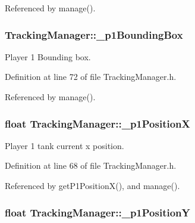 Referenced by manage().

\hypertarget{classTrackingManager_a4916085aebb34a3921f3592d7ae07767}{
\subsubsection[{\-\_\-p1\-Bounding\-Box}]{ Tracking\-Manager\-::\-\_\-p1\-Bounding\-Box\hspace{0.3cm}{\ttfamily [private]}}}\label{classTrackingManager_a4916085aebb34a3921f3592d7ae07767}


Player 1 Bounding box. 



Definition at line 72 of file Tracking\-Manager.\-h.



Referenced by manage().

\hypertarget{classTrackingManager_a14b43a5e0cd605fff6b3308d0377f697}{
\subsubsection[{\-\_\-p1\-Position\-X}]{\setlength{\rightskip}{0pt plus 5cm}float Tracking\-Manager\-::\-\_\-p1\-Position\-X\hspace{0.3cm}{\ttfamily [private]}}}\label{classTrackingManager_a14b43a5e0cd605fff6b3308d0377f697}


Player 1 tank current x position. 



Definition at line 68 of file Tracking\-Manager.\-h.



Referenced by get\-P1\-Position\-X(), and manage().

\hypertarget{classTrackingManager_aa5b384a370b1ddccf76badc8a55459b1}{
\subsubsection[{\-\_\-p1\-Position\-Y}]{\setlength{\rightskip}{0pt plus 5cm}float Tracking\-Manager\-::\-\_\-p1\-Position\-Y\hspace{0.3cm}{\ttfamily [private]}}}\label{classTrackingManager_aa5b384a370b1ddccf76badc8a55459b1}


